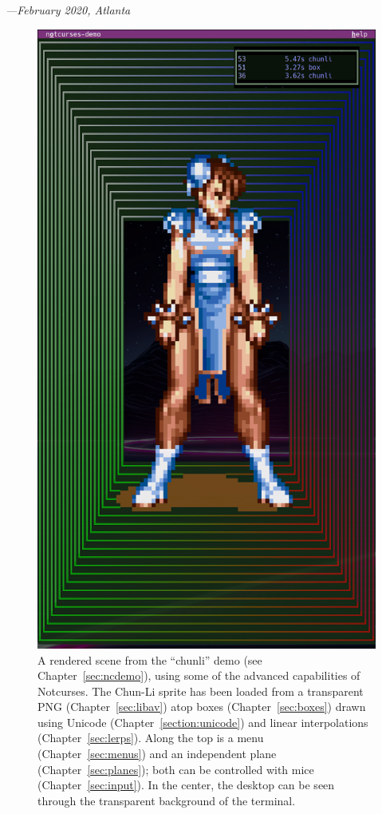 \documentclass[letterpaper,10pt]{article}
\begin{document}
\begin{flushright}
  \textit{---February 2020, Atlanta}
\end{flushright}

\newpage

\vfill
\begin{figure}
\centering
\includegraphics[width=.65\linewidth]{media/chunli-box-front.png}
\caption[An example render.]{A rendered scene from the ``chunli'' demo (see Chapter~\ref{sec:ncdemo}),
  using some of the advanced capabilities of Notcurses. The Chun-Li sprite has
  been loaded from a transparent PNG (Chapter~\ref{sec:libav}) atop boxes
  (Chapter~\ref{sec:boxes}) drawn using Unicode (Chapter~\ref{section:unicode})
  and linear interpolations (Chapter~\ref{sec:lerps}). Along the top is a
  menu (Chapter~\ref{sec:menus}) and an independent plane (Chapter~\ref{sec:planes});
  both can be controlled with mice (Chapter~\ref{sec:input}). In the center,
  the desktop can be seen through the transparent background of the terminal.}
\end{figure}
\vfill
\newpage
\end{document}
